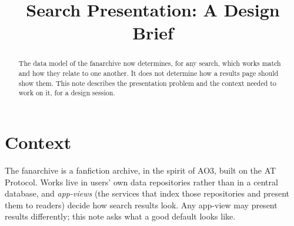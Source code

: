 \documentclass{amsart}
\title{Search Presentation: A Design Brief}
\theoremstyle{remark}
\begin{document}
\maketitle
\begin{abstract}
The data model of the fanarchive now determines, for any search, which works match and how they relate to one another. It does not determine how a results page should show them. This note describes the presentation problem and the context needed to work on it, for a design session.
\end{abstract}

\section{Context}
The fanarchive is a fanfiction archive, in the spirit of AO3, built on the AT Protocol. Works live in users' own data repositories rather than in a central database, and \emph{app-views} (the services that index those repositories and present them to readers) decide how search results look. Any app-view may present results differently; this note asks what a good default looks like.
\end{document}
